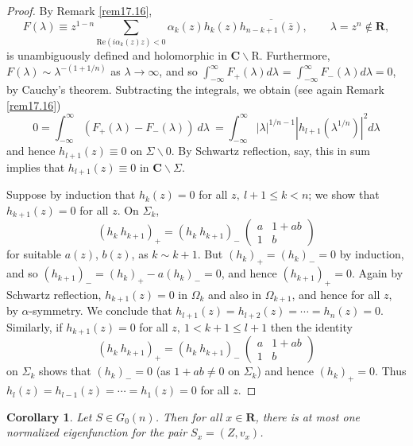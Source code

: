 \documentclass{surv-l}
\theoremstyle{plain}
\newtheorem{cor}[theorem]{Corollary}
\theoremstyle{definition}
\numberwithin{equation}{chapter}
\begin{document}
\begin{proof}
By Remark \ref{rem17.16},
\begin{equation*}
F(\lambda)\equiv z^{1-n}\sum_{\mathrm{Re}(i\alpha_{k}(z)z)<0} \alpha_{k}(z)h_{k}(z)\overline{h_{n-k+1}(\overline{z})},\qquad \lambda=z^{n}\not\in \mathbf{R},
\end{equation*}
is unambiguously defined and holomorphic in $\mathbf{C}\backslash \mathrm{R}$. Furthermore, $F(\lambda)\sim \lambda^{-(1+1/n)}$ as $\lambda \rightarrow\infty$, and so $\int_{-\infty}^{\infty}F_{+}(\lambda)  d\lambda$ = $\int_{-\infty}^{\infty}F_{-}(\lambda)d\lambda=0$, by Cauchy's theorem. Subtracting the integrals, we obtain (see again Remark \ref{rem17.16})
\begin{equation*}
0=\int_{-\infty}^{\infty}(F_{+}(\lambda)-F_{-}(\lambda))\  d\lambda\ = \int_{-\infty}^{\infty}|\lambda|^{1/n-1}|h_{l+1}(\lambda^{1/n})|^{2}d\lambda
\end{equation*}
and hence $h_{l+1}(z)\equiv 0$ on $\Sigma\backslash 0$. By Schwartz reflection, say, this in sum implies that $h_{l+1}(z)\equiv 0$ in $ \textbf{C}\backslash \Sigma$.

Suppose by induction that $h_{k}(z)=0$ for all $z,\ l+1\leq k<n$; we show that $h_{k+1}(z)=0$ for all $z$. On $\Sigma_{k}$,
\begin{equation*}
(h_{k}\ h_{k+1})_{+}=(h_{k}\ h_{k+1})_{-}\ \left(\begin{array}{cc}
a & 1+ab\\
1 & b
\end{array}\right)
\end{equation*}
for suitable $a(z)$, $b(z)$, as $k\sim k+1$. But $(h_{k})_{+}=(h_{k})_{-}=0$ by induction, and so $(h_{k+1})_{-}=(h_{k})_{+}-a(h_{k})_{-}=0$, and hence $(h_{k+1})_{+}=0$. Again by Schwartz reflection, $h_{k+1}(z) =0$ in $\Omega_{k}$ and also in $\Omega_{k+1}$, and hence for all $z$, by $\alpha$-symmetry. We conclude that $h_{l+1}(z)=h_{l+2}(z) = \cdots =h_{n}(z)=0$. Similarly, if $h_{k+1}(z)=0$ for all $z,\ 1<k+1\leq l+1$ then the identity
\begin{equation*}
(h_{k}\ h_{k+1})_{+}=(h_{k}\ h_{k+1})_{-}\ \left(\begin{array}{cc}
a & 1+ab\\
1 & b
\end{array}\right)
\end{equation*}
on $\Sigma_{k}$ shows that $(h_{k})_{-}=0$ (as ${1}+ ab\neq 0$ on $\Sigma_{k}$) and hence $(h_{k})_{+}=0$. Thus $h_{l}(z)=h_{l-1}(z)=\cdots= h_{1}(z)=0$ for all $z$.
\end{proof}
\setcounter{theorem}{2}
\begin{cor}\label{coro22.3}
Let $S\in G_{0}(n)$. Then for all $x\in \mathbf{R}$, there is at most one normalized eigenfunction for the pair $S_{x}=(Z, v_{x})$.
\end{cor}
\end{document}
